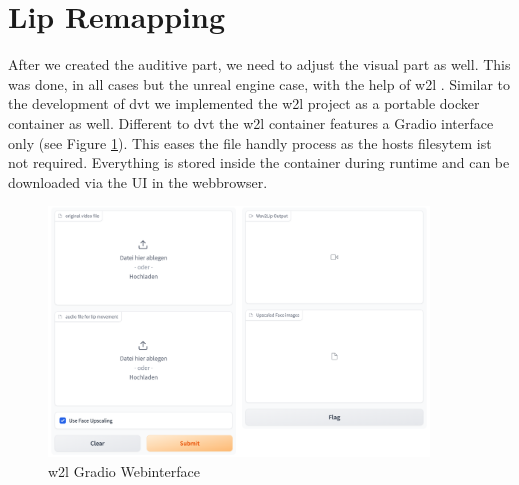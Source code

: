 \documentclass[
  a4paper,  %
  twoside,  %
  bibliography=totoc,
  headsepline,
  cleardoublepage=empty,
  parskip=half,
  draft=false
]{scrbook}
\begin{document}
\section{Lip Remapping}
 After we created the auditive part, we need to adjust the visual part as well. This was done, in all cases but the unreal engine case, with the help of \gls{w2l} \cite{mukhopadhyayWav2LipAccuratelyLipsyncing2023}. Similar to the development of \gls{dvt} we implemented the \gls{w2l} project as a portable docker container as well. Different to \gls{dvt} the \gls{w2l} container features a Gradio interface only (see Figure \ref{fig:w2l-gradio}). This eases the file handly process as the hosts filesytem ist not required. Everything is stored inside the container during runtime and can be downloaded via the UI in the webbrowser.
 \begin{figure}[h]
  \centering
  \includegraphics[width=0.9\textwidth]{./graphics/images/wav2lip/w2l-gradio.png}
  \caption{\gls{w2l} Gradio Webinterface}
  \label{fig:w2l-gradio}
\end{figure}
\end{document}
